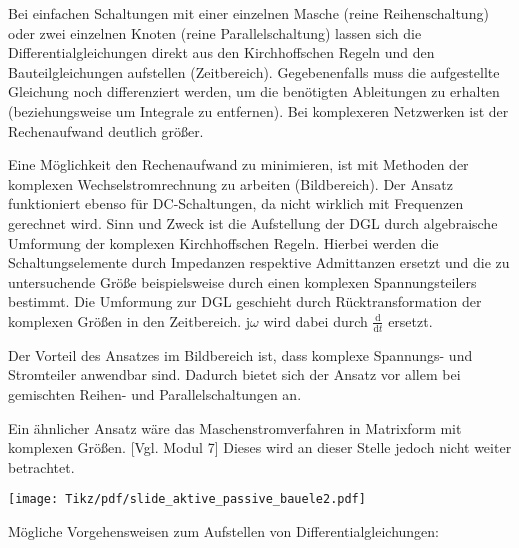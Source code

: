\begin{frame}
{    %

    Bei einfachen Schaltungen mit einer einzelnen Masche (reine Reihenschaltung) oder zwei einzelnen Knoten (reine Parallelschaltung)
    lassen sich die Differentialgleichungen direkt aus den Kirchhoffschen Regeln und den Bauteilgleichungen aufstellen (Zeitbereich).
    Gegebenenfalls muss die aufgestellte Gleichung noch differenziert werden, um die benötigten Ableitungen zu erhalten
    (beziehungsweise um Integrale zu entfernen). 
    Bei komplexeren Netzwerken ist der Rechenaufwand deutlich größer. 

    Eine Möglichkeit den Rechenaufwand zu minimieren, ist mit Methoden der komplexen Wechselstromrechnung zu arbeiten (Bildbereich). 
    Der Ansatz funktioniert ebenso für DC-Schaltungen, da nicht wirklich mit Frequenzen gerechnet wird. 
    Sinn und Zweck ist die Aufstellung der DGL durch algebraische Umformung der komplexen Kirchhoffschen Regeln.
    Hierbei werden die Schaltungselemente durch Impedanzen respektive Admittanzen ersetzt und die zu untersuchende Größe
    beispielsweise durch einen komplexen Spannungsteilers bestimmt. 
    Die Umformung zur DGL geschieht durch Rücktransformation der komplexen Größen in den Zeitbereich.
    $\mathrm{j}\omega$ wird dabei durch $\frac{\mathrm{d}}{\mathrm{d} t}$ ersetzt. 
    
    Der Vorteil des Ansatzes im Bildbereich ist, dass komplexe Spannungs- und Stromteiler anwendbar sind. 
    Dadurch bietet sich der Ansatz vor allem bei gemischten Reihen- und Parallelschaltungen an.  

    Ein ähnlicher Ansatz wäre das Maschenstromverfahren in Matrixform mit komplexen Größen. [Vgl. Modul 7] 
    Dieses wird an dieser Stelle jedoch nicht weiter betrachtet.

}%
\b{%
    \texttt{[image: Tikz/pdf/slide\_aktive\_passive\_bauele2.pdf]}
}%
\end{frame}

\begin{frame}\ftx{\subsecname}%
\b{%
    Mögliche Vorgehensweisen zum Aufstellen von Differentialgleichungen:\\[5pt]
}
\end{frame}

